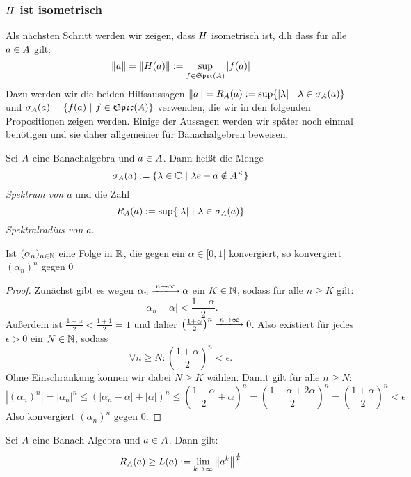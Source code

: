 \subsubsection{$H$ ist isometrisch}\label{sec:isometrisch}

Als nächsten Schritt werden wir zeigen, dass $H$ isometrisch ist, d.h dass für alle $a \in A$ gilt:
	\[\left\lVert a\right\rVert = \left\lVert H(a)\right\rVert := \underset{f \in \mathfrak{Spec}(A)}{\sup}\left|f(a)\right|\]
Dazu werden wir die beiden Hilfsaussagen $\left\lVert a\right\rVert = R_A(a) := \sup\{|\lambda| ~|~ \lambda \in \sigma_A(a)\}$ und $\sigma_A(a) = \{f(a) ~|~ f \in \mathfrak{Spec}(A)\}$ verwenden, die wir in den folgenden Propositionen zeigen werden. Einige der Aussagen werden wir später noch einmal benötigen und sie daher allgemeiner für Banachalgebren beweisen.

\begin{defn}[Spektrum] %
Sei $A$ eine Banachalgebra und $a \in A$. Dann heißt die Menge
	\[\sigma_A(a) := \{\lambda \in \mathbb{C} ~|~ \lambda e - a \notin A^\times\}\]
\emph{Spektrum von $a$} und die Zahl
	\[R_A(a) := \sup\{|\lambda| ~|~ \lambda \in \sigma_A(a)\}\]
\emph{Spektralradius von $a$}. 
\end{defn}


\begin{prop}\label{prop:Konvergenz}
Ist $(\alpha_n)_{n\in\mathbb{N}}$ eine Folge in $\mathbb{R}$, die gegen ein $\alpha \in [0,1[$ konvergiert, so konvergiert $(\alpha_n)^n$ gegen $0$
\end{prop}

\begin{proof}
Zunächst gibt es wegen $\alpha_n \xlongrightarrow{n\to\infty} \alpha$ ein $K \in \mathbb{N}$, sodass für alle $n\geq K$ gilt:
	\[|\alpha_n - \alpha| < \frac{1-\alpha}{2}.\]
Außerdem ist $\frac{1+\alpha}{2} < \frac{1+1}{2} = 1$ und daher $\left(\frac{1+\alpha}{2}\right)^n \xlongrightarrow{n\to\infty} 0$. Also existiert für jedes $\epsilon > 0$ ein $N \in \mathbb{N}$, sodass
	\[\forall n \geq N: \left(\frac{1+\alpha}{2}\right)^n < \epsilon.\]
Ohne Einschränkung können wir dabei $N \geq K$ wählen. Damit gilt für alle $n \geq N$:
	\[\left|\left(\alpha_n\right)^n\right| = \left|\alpha_n\right|^n \leq \left(\left|\alpha_n - \alpha\right| + \left|\alpha\right|\right)^n \leq \left(\frac{1-\alpha}{2} + \alpha\right)^n = \left(\frac{1-\alpha+2\alpha}{2}\right)^n = \left(\frac{1+\alpha}{2}\right)^n < \epsilon\]
Also konvergiert $(\alpha_n)^n$ gegen $0$.
\end{proof}


\begin{prop}\label{prop:R-groesser-lima}
Sei $A$ eine Banach-Algebra und $a \in A$. Dann gilt:
\[ R_A(a) \geq L(a) := \underset{k\to\infty}{\lim}\left\lVert a^k\right\rVert^\frac{1}{k}\]
\end{prop}

